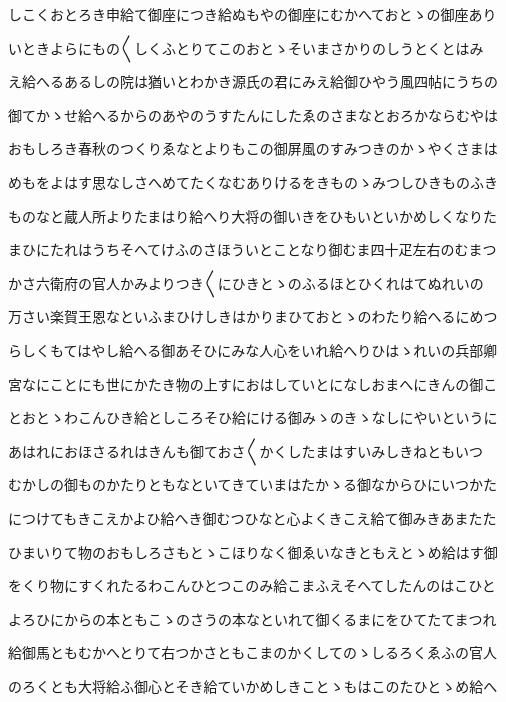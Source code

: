 \documentclass[a4paper,11pt,landscape]{ltjtarticle}
\begin{document}
\par\medskip
しこくおとろき申給て御座につき給ぬもやの御座にむかへておとゝの御座あり
\par\medskip
いときよらにもの〱しくふとりてこのおとゝそいまさかりのしうとくとはみ
\par\medskip
え給へるあるしの院は猶いとわかき源氏の君にみえ給御ひやう風四帖にうちの
\par\medskip
御てかゝせ給へるからのあやのうすたんにしたゑのさまなとおろかならむやは
\par\medskip
おもしろき春秋のつくりゑなとよりもこの御屏風のすみつきのかゝやくさまは
\par\medskip
めもをよはす思なしさへめてたくなむありけるをきものゝみつしひきものふき
\par\medskip
ものなと蔵人所よりたまはり給へり大将の御いきをひもいといかめしくなりた
\par\medskip
まひにたれはうちそへてけふのさほういとことなり御むま四十疋左右のむまつ
\par\medskip
かさ六衛府の官人かみよりつき〱にひきとゝのふるほとひくれはてぬれいの
\par\medskip
万さい楽賀王恩なといふまひけしきはかりまひておとゝのわたり給へるにめつ
\par\medskip
らしくもてはやし給へる御あそひにみな人心をいれ給へりひはゝれいの兵部卿
\par\medskip
宮なにことにも世にかたき物の上すにおはしていとになしおまへにきんの御こ
\par\medskip
とおとゝわこんひき給としころそひ給にける御みゝのきゝなしにやいというに
\par\medskip
あはれにおほさるれはきんも御ておさ〱かくしたまはすいみしきねともいつ
\par\medskip
むかしの御ものかたりともなといてきていまはたかゝる御なからひにいつかた
\par\medskip
につけてもきこえかよひ給へき御むつひなと心よくきこえ給て御みきあまたた
\par\medskip
ひまいりて物のおもしろさもとゝこほりなく御ゑいなきともえとゝめ給はす御
\par\medskip
をくり物にすくれたるわこんひとつこのみ給こまふえそへてしたんのはこひと
\par\medskip
よろひにからの本ともこゝのさうの本なといれて御くるまにをひてたてまつれ
\par\medskip
給御馬ともむかへとりて右つかさともこまのかくしてのゝしるろくゑふの官人
\par\medskip
のろくとも大将給ふ御心とそき給ていかめしきことゝもはこのたひとゝめ給へ
\par\medskip
\end{document}
